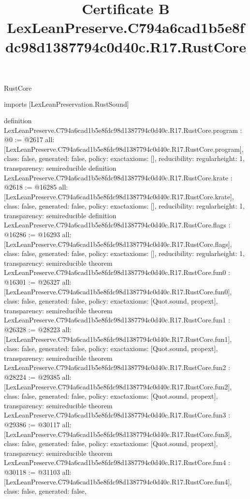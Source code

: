 \begin{lexlean}{RustCore}
\title{Certificate B LexLeanPreserve.C794a6cad1b5e8fdc98d1387794c0d40c.R17.RustCore}
\begin{coremodule}
imports [LexLeanPreservation.RustSound]

definition LexLeanPreserve.C794a6cad1b5e8fdc98d1387794c0d40c.R17.RustCore.program : @0 := @2617 {
  all: [LexLeanPreserve.C794a6cad1b5e8fdc98d1387794c0d40c.R17.RustCore.program],
  class: false,
  generated: false,
  policy: exact{axioms: []},
  reducibility: regular{height: 1},
  transparency: semireducible
}
definition LexLeanPreserve.C794a6cad1b5e8fdc98d1387794c0d40c.R17.RustCore.krate : @2618 := @16285 {
  all: [LexLeanPreserve.C794a6cad1b5e8fdc98d1387794c0d40c.R17.RustCore.krate],
  class: false,
  generated: false,
  policy: exact{axioms: []},
  reducibility: regular{height: 1},
  transparency: semireducible
}
definition LexLeanPreserve.C794a6cad1b5e8fdc98d1387794c0d40c.R17.RustCore.flags : @16286 := @16293 {
  all: [LexLeanPreserve.C794a6cad1b5e8fdc98d1387794c0d40c.R17.RustCore.flags],
  class: false,
  generated: false,
  policy: exact{axioms: []},
  reducibility: regular{height: 1},
  transparency: semireducible
}
theorem LexLeanPreserve.C794a6cad1b5e8fdc98d1387794c0d40c.R17.RustCore.fun0 : @16301 := @26327 {
  all: [LexLeanPreserve.C794a6cad1b5e8fdc98d1387794c0d40c.R17.RustCore.fun0],
  class: false,
  generated: false,
  policy: exact{axioms: [Quot.sound, propext]},
  transparency: semireducible
}
theorem LexLeanPreserve.C794a6cad1b5e8fdc98d1387794c0d40c.R17.RustCore.fun1 : @26328 := @28223 {
  all: [LexLeanPreserve.C794a6cad1b5e8fdc98d1387794c0d40c.R17.RustCore.fun1],
  class: false,
  generated: false,
  policy: exact{axioms: [Quot.sound, propext]},
  transparency: semireducible
}
theorem LexLeanPreserve.C794a6cad1b5e8fdc98d1387794c0d40c.R17.RustCore.fun2 : @28224 := @29385 {
  all: [LexLeanPreserve.C794a6cad1b5e8fdc98d1387794c0d40c.R17.RustCore.fun2],
  class: false,
  generated: false,
  policy: exact{axioms: [Quot.sound, propext]},
  transparency: semireducible
}
theorem LexLeanPreserve.C794a6cad1b5e8fdc98d1387794c0d40c.R17.RustCore.fun3 : @29386 := @30117 {
  all: [LexLeanPreserve.C794a6cad1b5e8fdc98d1387794c0d40c.R17.RustCore.fun3],
  class: false,
  generated: false,
  policy: exact{axioms: [Quot.sound, propext]},
  transparency: semireducible
}
theorem LexLeanPreserve.C794a6cad1b5e8fdc98d1387794c0d40c.R17.RustCore.fun4 : @30118 := @31103 {
  all: [LexLeanPreserve.C794a6cad1b5e8fdc98d1387794c0d40c.R17.RustCore.fun4],
  class: false,
  generated: false,
}
\end{coremodule}
\end{lexlean}
